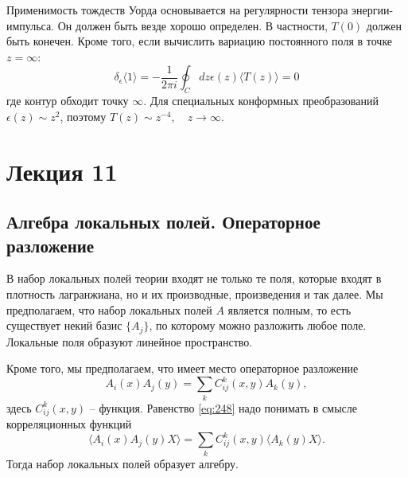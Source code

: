\documentclass[a4paper,12pt]{article}
\theoremstyle{definition}
\theoremstyle{definition}
\theoremstyle{definition}
\begin{document}
Применимость тождеств Уорда основывается на регулярности тензора энергии-импульса. Он должен быть везде хорошо определен. В частности, $T(0)$ должен быть конечен. Кроме того, если вычислить вариацию постоянного поля в точке $z=\infty$:
\begin{equation}
  \label{eq:247}
  \delta_{\epsilon} \langle 1\rangle =-\frac{1}{2\pi i} \oint_{C}dz \epsilon(z) \langle T(z)\rangle =0
\end{equation}
где контур обходит точку $\infty$. Для специальных конформных преобразований $\epsilon(z)\sim z^{2}$, поэтому $T(z)\sim z^{-4},\quad z\to \infty$.

\section{Лекция 11}
\label{sec:lecture-11}

\subsection{Алгебра локальных полей. Операторное разложение}
\label{sec:ope}

В набор локальных полей теории входят не только те поля, которые входят в плотность лагранжиана, но и их производные, произведения и так далее.
Мы предполагаем, что набор локальных полей $A$ является полным, то есть существует некий базис $\{ A_{j}\}$, по которому можно разложить любое поле. Локальные поля образуют линейное пространство.

Кроме того, мы предполагаем, что имеет место операторное разложение
\begin{equation}
  \label{eq:248}
  A_{i}(x)A_{j}(y) =\sum_{k} C^{k}_{ij} (x,y) A_{k}(y),
\end{equation}
здесь $C_{ij}^{k}(x,y)$ -- функция. Равенство \eqref{eq:248} надо понимать в смысле корреляционных функций
\begin{equation}
  \label{eq:249}
  \langle A_{i}(x) A_{j}(y) X\rangle = \sum_{k} C^{k}_{ij} (x,y) \langle A_{k}(y) X\rangle.
\end{equation}
Тогда набор локальных полей образует алгебру. 
\end{document}
